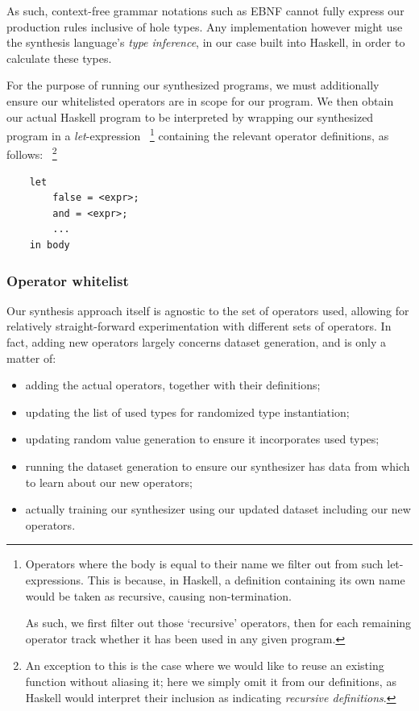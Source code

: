 \documentclass{article}
\begin{document}
As such, context-free grammar notations such as EBNF cannot fully express our production rules inclusive of hole types.
Any implementation however might use the synthesis language's \emph{type inference},
in our case built into Haskell, in order to calculate these types.

For the purpose of running our synthesized programs,
we must additionally ensure our whitelisted operators are in scope for our program.
We then obtain our actual Haskell program to be interpreted
by wrapping our synthesized program in a \emph{let}-expression%
~\footnote{
    Operators where the body is equal to their name we filter out from such let-expressions.
    This is because, in Haskell,
    a definition containing its own name would be taken as recursive,
    causing non-termination.

    As such, we first filter out those `recursive' operators,
    then for each remaining operator track
    whether it has been used in any given program.
}
containing the relevant operator definitions, as follows:%
~\footnote{
    An exception to this is the case where we would like to reuse an existing function without aliasing it;
    here we simply omit it from our definitions,
    as Haskell would interpret their inclusion as indicating \emph{recursive definitions}.
}

\begin{verbatim}
    let
        false = <expr>;
        and = <expr>;
        ...
    in body
\end{verbatim}

\subsubsection{Operator whitelist}

Our synthesis approach itself is agnostic to the set of operators used,
allowing for relatively straight-forward experimentation with different sets of operators.
In fact, adding new operators largely concerns dataset generation, and is only a matter of:
\begin{itemize}
    \item adding the actual operators, together with their definitions;
    \item updating the list of used types for randomized type instantiation;
    \item updating random value generation to ensure it incorporates used types;
    \item running the dataset generation to ensure our synthesizer has data from which to learn about our new operators;
    \item actually training our synthesizer using our updated dataset including our new operators.
\end{itemize}
\end{document}
